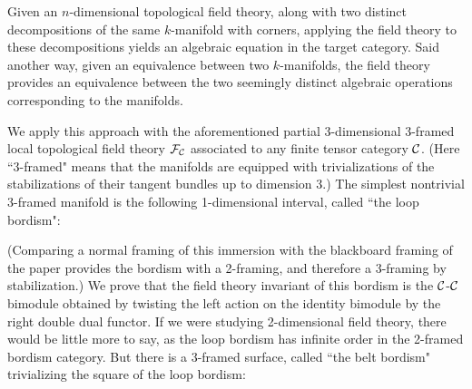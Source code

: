 \documentclass{amsart}
\begin{document}
Given an $n$-dimensional topological field theory, along with two distinct decompositions of the same $k$-manifold with corners, applying the field theory to these decompositions yields an algebraic equation in the target category.  Said another way, given an equivalence between two $k$-manifolds, the field theory provides an equivalence between the two seemingly distinct algebraic operations corresponding to the manifolds.

We apply this approach with the aforementioned partial 3-dimensional 3-framed local topological field theory $\mathcal F_\mathcal C$ associated to any finite tensor category $\mathcal C$.  (Here ``3-framed" means that the manifolds are equipped with trivializations of the stabilizations of their tangent bundles up to dimension 3.)  The simplest nontrivial 3-framed manifold is the following 1-dimensional interval, called ``the loop bordism":
\begin{center}
\end{center}
(Comparing a normal framing of this immersion with the blackboard framing of the paper provides the bordism with a 2-framing, and therefore a 3-framing by stabilization.)  We prove that the field theory invariant of this bordism is the $\mathcal C$-$\mathcal C$ bimodule obtained by twisting the left action on the identity bimodule by the right double dual functor.  If we were studying 2-dimensional field theory, there would be little more to say, as the loop bordism has infinite order in the 2-framed bordism category.  But there is a 3-framed surface, called ``the belt bordism" trivializing the square of the loop bordism: 
\end{document}
